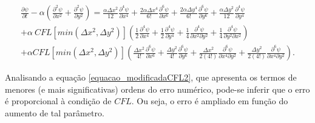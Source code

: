 \documentclass[a0,portrait]{a0poster}
\begin{document}
\begin{minipage}[c]{\linewidth}
\begin{framed}
\begin{multicols}{2}
\begin{equation} \label{equacao_modificadaCFL2}
\begin{split}
\frac{\partial \psi}{\partial t} - \alpha \left(\frac{\partial^{2} \psi}{\partial x^{2}} + \frac{\partial^{2} \psi}{\partial y^{2}} \right) = \frac{\alpha \Delta x^{2}}{12} \frac{\partial^{4} \psi}{\partial x^{4}}+ \frac{2 \alpha \Delta x^{4}}{6!} \frac{\partial^{6} \psi}{\partial x^{6}} + \frac{2 \alpha \Delta y^{4}}{6!} \frac{\partial^{6} \psi}{\partial y^{6}} + \frac{\alpha \Delta y^{2}}{12} \frac{\partial^{4} \psi}{\partial y^{4}} \\ + \alpha \ CFL \left[min(\Delta x^{2}, \Delta y^{2})\right] \left(\frac{1}{2} \frac{\partial^{4} \psi}{\partial x^{4}} + \frac{1}{2} \frac{\partial^{4} \psi}{\partial y^{4}} + \frac{1}{4}\frac{\partial^{4} \psi}{\partial x^{2} \partial y^{2}} + \frac{1}{4} \frac{\partial^{4} \psi}{\partial y^{2} \partial x^{2}} \right) \\+ \alpha CFL \left[min(\Delta x^{2}, \Delta y^{2})\right]  \left(\frac{\Delta x^{2}}{4!} \frac{\partial^{6} \psi}{\partial x^{6}} + \frac{\Delta y^{2}}{4!} \frac{\partial^{6} \psi}{\partial y^{6}} + \frac{\Delta x^{2}}{2(4!)} \frac{\partial^{6} \psi}{\partial x^{4} \partial y^{2}} + \frac{\Delta y^{2}}{2(4!)} \frac{\partial^{6} \psi}{\partial x^{4} \partial y^{2}}\right).
\end{split}
\end{equation}

Analisando a equação \ref{equacao_modificadaCFL2}, que apresenta os termos de menores (e mais significativas) ordens do erro numérico, pode-se inferir que o erro é proporcional à condição de $CFL$. Ou seja, o erro é ampliado em função do aumento de tal parâmetro.
\color{Black}

\end{multicols}
\end{framed}
\end{minipage}
\end{document}
